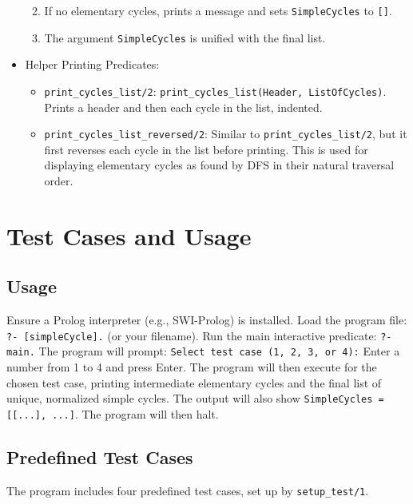 \documentclass[12pt,a4paper]{article}
\begin{document}
\begin{itemize}
\begin{enumerate}
\begin{itemize}
\end{itemize}
\item If no elementary cycles, prints a message and sets \texttt{SimpleCycles} to \texttt{[]}.
\item The argument \texttt{SimpleCycles} is unified with the final list.
\end{enumerate}
\item Helper Printing Predicates:
\begin{itemize}
\item \texttt{print\_cycles\_list/2}: \texttt{print\_cycles\_list(Header, ListOfCycles)}. Prints a header and then each cycle in the list, indented.
\item \texttt{print\_cycles\_list\_reversed/2}: Similar to \texttt{print\_cycles\_list/2}, but it first reverses each cycle in the list before printing. This is used for displaying elementary cycles as found by DFS in their natural traversal order.
\end{itemize}
\end{itemize}
\section{Test Cases and Usage}
\subsection{Usage}
Ensure a Prolog interpreter (e.g., SWI-Prolog) is installed.
Load the program file: \texttt{?- [simpleCycle].} (or your filename).
Run the main interactive predicate: \texttt{?- main.}
The program will prompt: \texttt{Select test case (1, 2, 3, or 4):}
Enter a number from 1 to 4 and press Enter.
The program will then execute for the chosen test case, printing intermediate elementary cycles and the final list of unique, normalized simple cycles. The output will also show \texttt{SimpleCycles = [[...], ...]}.
The program will then halt.
\subsection{Predefined Test Cases}
The program includes four predefined test cases, set up by \texttt{setup\_test/1}.
\end{document}
